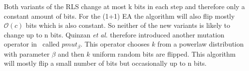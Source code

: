Both variants of the RLS change at most k bits in each step and therefore only a constant amount of bits. For the (1+1) EA the algorithm will also flip mostly $\mathcal{O}(c)$ bits which is also constant. So neither of the new variants is likely to change up to n bits. Quinzan \textit{et al.} therefore introduced another mutation operator in~\cite{friedrich2018evolutionary} called $pmut_\beta$. This operator chooses $k$ from a powerlaw distribution with parameter $\beta$ and then $k$ uniform random bits are flipped. This algorithm will mostly flip a small number of bits but occasionally up to n bits.